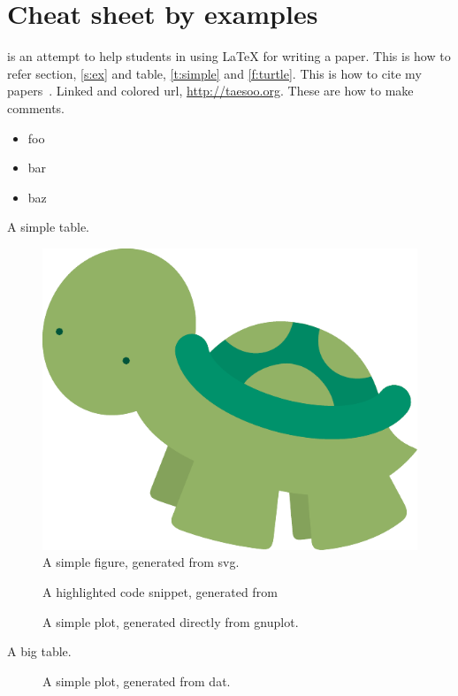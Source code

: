 \section{Cheat sheet by examples}
\label{s:ex}

\sys is an attempt to help students in using {\LaTeX} for writing a
paper.
This is how to refer section, \autoref{s:ex} and table,
\autoref{t:simple} and \autoref{f:turtle}.
This is how to cite my papers~\cite{kim:userfs,kim:poirot}.
Linked and colored url, \url{http://taesoo.org}. 
These are how to make comments.

\begin{itemize}[noitemsep,nolistsep]
 \setlength{\itemsep}{-0pt}
 \item foo
 \item bar
 \item baz
\end{itemize}

\begin{table}[h]
\centering
\footnotesize

\caption{A simple table.}
\label{t:simple}
\end{table}

\begin{figure}[h]
\centering
\footnotesize
\includegraphics[width=0.5\columnwidth]{fig/ex-turtle}
\caption{A simple figure, generated from svg.}
\label{f:turtle}
\end{figure}

\begin{figure}[t]
\centering
\footnotesize

\caption{A highlighted code snippet, generated from 
}
\label{f:code}
\end{figure}

\begin{figure}[H]
\centering
\footnotesize
{}
\caption{A simple plot, generated directly from gnuplot.}
\label{f:gaussian}
\end{figure}

\begin{table}[t]
\centering
\footnotesize

\caption{A big table.}
\label{t:big}
\end{table}

\begin{figure}[t]
\centering
\footnotesize
{}
\caption{A simple plot, generated from dat.}
\label{f:plot}
\end{figure}
